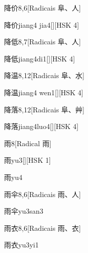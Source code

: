 \begin{entry}{降价}{8,6}[Radicais ⾩、⼈]
  \begin{phonetics}{降价}{jiang4 jia4}[][HSK 4]
  \end{phonetics}
\end{entry}

\begin{entry}{降低}{8,7}[Radicais ⾩、⼈]
  \begin{phonetics}{降低}{jiang4di1}[][HSK 4]
  \end{phonetics}
\end{entry}

\begin{entry}{降温}{8,12}[Radicais ⾩、⽔]
  \begin{phonetics}{降温}{jiang4 wen1}[][HSK 4]
  \end{phonetics}
\end{entry}

\begin{entry}{降落}{8,12}[Radicais ⾩、⾋]
  \begin{phonetics}{降落}{jiang4luo4}[][HSK 4]
  \end{phonetics}
\end{entry}

\begin{entry}{雨}{8}[Radical ⾬]
  \begin{phonetics}{雨}{yu3}[][HSK 1]
  \end{phonetics}
  \begin{phonetics}{雨}{yu4}
  \end{phonetics}
\end{entry}

\begin{entry}{雨伞}{8,6}[Radicais ⾬、⼈]
  \begin{phonetics}{雨伞}{yu3san3}
  \end{phonetics}
\end{entry}

\begin{entry}{雨衣}{8,6}[Radicais ⾬、⾐]
  \begin{phonetics}{雨衣}{yu3yi1}
  \end{phonetics}
\end{entry}

